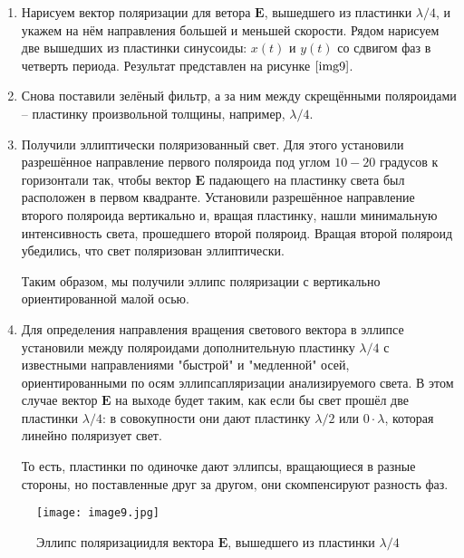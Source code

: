 \documentclass[a4paper,12pt]{article} %
\begin{document}
\begin{enumerate}
    \item Нарисуем вектор поляризации для ветора $\mathbf{E}$, вышедшего из пластинки $\lambda/4$, и укажем на нём направления большей и меньшей скорости. Рядом нарисуем две вышедших из пластинки синусоиды: $x(t)$ и $y(t)$ со сдвигом фаз в четверть периода. Результат представлен на рисунке $\ref{img9}$.

    \item Снова поставили зелёный фильтр, а за ним между скрещёнными поляроидами -- пластинку произвольной толщины, например, $\lambda/4$. 

    \item Получили эллиптически поляризованный свет. Для этого установили разрешённое направление первого поляроида под углом $10-20$ градусов к горизонтали так, чтобы вектор $\mathbf{E}$ падающего на пластинку света был расположен в первом квадранте. Установили разрешённое направление второго поляроида вертикально и, вращая пластинку, нашли минимальную интенсивность света, прошедшего второй поляроид. Вращая второй поляроид убедились, что свет поляризован эллиптически.

    Таким образом, мы получили эллипс поляризации с вертикально ориентированной малой осью.

    \item Для определения направления вращения светового вектора в эллипсе установили между поляроидами дополнительную пластинку $\lambda/4$ с известными направлениями "быстрой" и "медленной" осей, ориентированными по осям эллипсапляризации анализируемого света. В этом случае вектор $\mathbf{E}$ на выходе будет таким, как если бы свет прошёл две пластинки $\lambda/4$: в совокупности они дают пластинку $\lambda/2$ или $0\cdot\lambda$, которая линейно поляризует свет.

    То есть, пластинки по одиночке дают эллипсы, вращающиеся в разные стороны, но поставленные друг за другом, они скомпенсируют разность фаз.
\end{enumerate}

\begin{figure}[h]
\begin{center}
    \texttt{[image: image9.jpg]}
\end{center}
    \caption{Эллипс поляризациидля вектора $\mathbf{E}$, вышедшего из пластинки $\lambda/4$}
    \label{img9}
\end{figure}

\newpage
\end{document}
